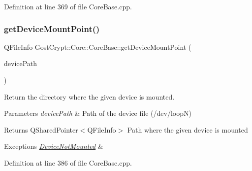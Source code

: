 Definition at line 369 of file Core\+Base.\+cpp.

\mbox{\label{class_gost_crypt_1_1_core_1_1_core_base_a1b3c979c1f14e087d8bce55f70fb5320}} 
\subsubsection{\texorpdfstring{get\+Device\+Mount\+Point()}{getDeviceMountPoint()}}
{\footnotesize\ttfamily Q\+File\+Info Gost\+Crypt\+::\+Core\+::\+Core\+Base\+::get\+Device\+Mount\+Point (\begin{DoxyParamCaption}\item[{const Q\+File\+Info}]{device\+Path }\end{DoxyParamCaption})\hspace{0.3cm}{\ttfamily [protected]}}



Return the directory where the given device is mounted. 


\begin{DoxyParams}{Parameters}
{\em device\+Path} & Path of the device file (/dev/loopN) \\
\hline
\end{DoxyParams}
\begin{DoxyReturn}{Returns}
Q\+Shared\+Pointer$<$\+Q\+File\+Info$>$ Path where the given device is mounted 
\end{DoxyReturn}

\begin{DoxyExceptions}{Exceptions}
{\em \hyperlink{class_gost_crypt_1_1_core_1_1_device_not_mounted}{Device\+Not\+Mounted}} & \\
\hline
\end{DoxyExceptions}


Definition at line 386 of file Core\+Base.\+cpp.

\mbox{\label{class_gost_crypt_1_1_core_1_1_core_base_a306718b124fedfb427a840dd6718514e}} 
